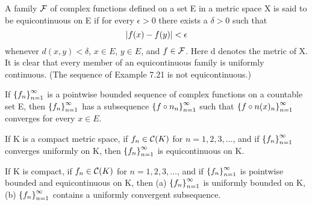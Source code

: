 


\begin{definition}[Equicontinuity] %
  \label{def:chap7:equicontinuity}
  A family $\mathcal{F}$ of complex functions defined on a set E
  in a metric space X is said to be equicontinuous on E if for every
  $\epsilon > 0$ there exists a $\delta > 0$ such that
  \[ \left\lvert f(x) - f(y) \right\rvert < \epsilon \]
  whenever $d(x, y) < \delta$, $x \in E$, $y \in E$, and $f \in
  \mathcal{F}$. Here d denotes the metric of X.
  It is clear that every member of an equicontinuous family is
  uniformly continuous.
  (The sequence of Example 7.21 is not equicontinuous.)
\end{definition}


\begin{theorem} %
  \label{thm:chap7:hellys_selection}
  If $\left\{ f_n \right\}_{n=1}^\infty$ is a pointwise bounded sequence of complex
  functions on a countable set E, then $\left\{ f_n \right\}_{n=1}^\infty$ has a
  subsequence $\left\{ f \circ n_n \right\}_{n=1}^\infty$ such that $\left\{ f \circ
  n(x)_n \right\}_{n=1}^\infty$ converges for every $x \in E$.
\end{theorem}

\begin{theorem} %
  \label{thm:chap7:unif_conv_implies_equicont}
  If K is a compact metric space, if $f_n \in \mathcal{C}(K)$ for $n=1,
  2, 3, \dots$, and if $\left\{ f_n \right\}_{n=1}^\infty$ converges uniformly on K, then
  $\left\{ f_n \right\}_{n=1}^\infty$ is equicontinuous on K.
\end{theorem}

\begin{theorem} %
  \label{thm:chap7:arzela_ascoli}
  If K is compact, if $f_n \in \mathcal{C}(K)$ for $n=1, 2, 3, \dots$,
  and if $\left\{ f_n \right\}_{n=1}^\infty$ is pointwise bounded and equicontinuous on K, then
  (a) $\left\{ f_n \right\}_{n=1}^\infty$ is uniformly bounded on K,
  (b) $\left\{ f_n \right\}_{n=1}^\infty$ contains a uniformly convergent subsequence.
\end{theorem}

